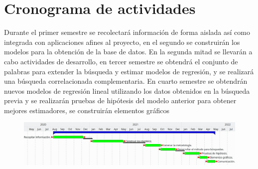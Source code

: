 \section {Cronograma de actividades}
Durante el primer semestre se recolectará información de forma aislada así como integrada con aplicaciones afines al proyecto, en el segundo se construirán los modelos para la obtención de la base de datos. En la segunda mitad se llevarán a cabo actividades de desarrollo, en tercer semestre se obtendrá el conjunto de palabras para extender la búsqueda y estimar modelos de regresión, y se realizará una búsqueda correlacionada complementaria. En cuarto semestre se obtendrán nuevos modelos de regresión lineal utilizando los datos obtenidos en la búsqueda previa y se realizarán pruebas de hipótesis del modelo anterior para obtener mejores estimadores, se construirán elementos gráficos 
\begin{figure}[H]\centering\includegraphics[width=1\linewidth]{gantt.png}\end{figure}